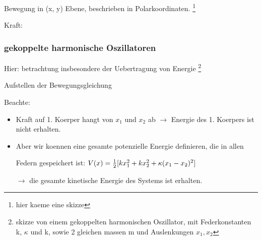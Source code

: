 Bewegung in (x, y) Ebene, beschrieben in Polarkoordinaten. \footnote{hier kaeme eine skizze}









Kraft:


\subsubsection{gekoppelte harmonische Oszillatoren}

Hier: betrachtung insbesondere der Uebertragung von Energie \footnote{skizze von einem gekoppelten harmonischen Oszillator, mit Federkonstanten k, $\kappa$ und k, sowie 2 gleichen massen m und Auslenkungen $x_1, x_2$}

Aufstellen der Bewegungsgleichung

Beachte:
\begin{itemize}
	\item Kraft auf 1. Koerper hangt von $x_1$  und $x_2$ ab $\rightarrow$ Energie des 1. Koerpers ist nicht erhalten.

	\item Aber wir koennen eine gesamte potenzielle Energie definieren, die in allen 

	Federn gespeichert ist:
	$V(x) = {1\over 2} [k x_1^2 + k x_2^2 + \kappa (x_1 - x_2)^2]$ \label{eq:II34}
	
	$\rightarrow$ die gesamte kinetische Energie des Systems ist erhalten.
\end{itemize}


